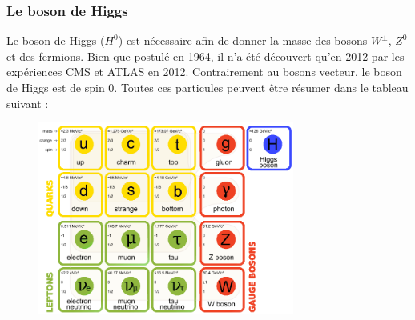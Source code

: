 \subsubsection{Le boson de Higgs}
Le boson de Higgs ($H^{0}$) est nécessaire afin de donner la masse des bosons $W^{\pm}$, $Z^{0}$ et des fermions. Bien que postulé en 1964, il n'a été découvert qu'en 2012 par les expériences CMS et ATLAS en 2012. Contrairement au bosons vecteur, le boson de Higgs est de spin 0.
\newpage
Toutes ces particules peuvent être résumer dans le tableau suivant : 
\begin{figure}[h!]
\centering
\includegraphics[width=0.75\textwidth]{SM/bestiaire2.png}
\label{bestiaire}
\end{figure}
\marginpar
